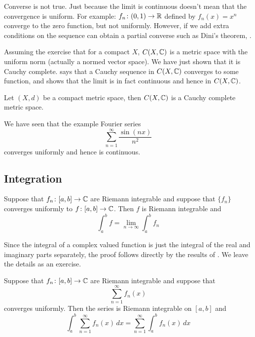 Converse is not true.  Just because the limit is continuous doesn't mean
that the convergence is uniform.  For example:
$f_n \colon (0,1) \to {\mathbb{R}}$ defined by $f_n(x) = x^n$ converge to
the zero function, but not uniformly.  However, if we add extra conditions
on the sequence can obtain a partial converse such as Dini's theorem,
.

Assuming the exercise that for a compact $X$, $C(X,{\mathbb{C}})$ is a metric space with
the uniform norm (actually a normed vector space).  We have just shown that
it is Cauchy complete.   says that a Cauchy
sequence in $C(X,{\mathbb{C}})$ converges to some function,
and  shows that the limit is in fact
continuous and hence in $C(X,{\mathbb{C}})$.

\begin{cor}
Let $(X,d)$ be a compact metric space, then $C(X,{\mathbb{C}})$ is a Cauchy
complete metric space.
\end{cor}

\begin{example}
We have seen that the example Fourier series 
\begin{equation*}
\sum_{n=1}^\infty \frac{\sin(nx)}{n^2}
\end{equation*}
converges uniformly and hence is continuous.
\end{example}

\subsection{Integration}

\begin{prop} \label{prop:complexlimitswapintegral}
Suppose that $f_n \colon [a,b] \to {\mathbb{C}}$
are Riemann integrable and suppose that $\{ f_n \}$ converges
uniformly to $f \colon [a,b] \to {\mathbb{C}}$.  Then $f$ is Riemann integrable
and
\begin{equation*}
\int_a^b f = \lim_{n\to \infty} \int_a^b f_n
\end{equation*}
\end{prop}

Since the integral of a complex valued function is just the integral of
the real and imaginary parts separately,
the proof follows directly by the results of .  We
leave the details as an exercise.

\begin{cor}
Suppose that $f_n \colon [a,b] \to {\mathbb{C}}$
are Riemann integrable and suppose that
\begin{equation*}
\sum_{n=1}^\infty f_n(x)
\end{equation*}
converges uniformly.  Then the series is Riemann integrable on $[a,b]$
and
\begin{equation*}
\int_a^b \sum_{n=1}^\infty f_n(x) \,dx
=
\sum_{n=1}^\infty \int_a^b f_n(x) \,dx
\end{equation*}
\end{cor}

